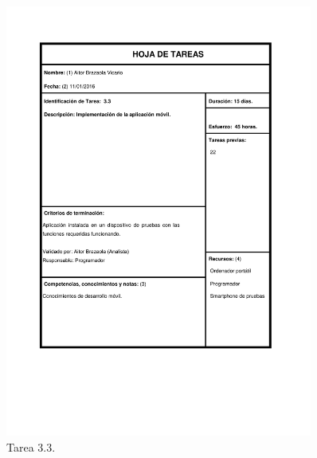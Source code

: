 \documentclass{DeustoFDP}
\begin{document}
\begin{figure}[H]
	\centering
	\includegraphics[width=0.9\textwidth]{fig/Tareas/33}
	\caption{Tarea 3.3.}
	\label{fig:t33}
\end{figure}
\end{document}
